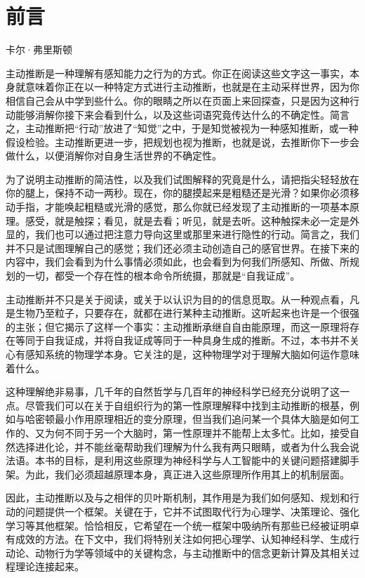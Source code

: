 \chapter*{前言}
卡尔·弗里斯顿

主动推断是一种理解有感知能力之行为的方式。你正在阅读这些文字这一事实，本身就意味着你正在以一种特定方式进行主动推断，也就是在主动采样世界，因为你相信自己会从中学到些什么。你的眼睛之所以在页面上来回探查，只是因为这种行动能够消解你接下来会看到什么，以及这些词语究竟传达什么的不确定性。简言之，主动推断把“行动”放进了“知觉”之中，于是知觉被视为一种感知推断，或一种假设检验。主动推断更进一步，把规划也视为推断，也就是说，去推断你下一步会做什么，以便消解你对自身生活世界的不确定性。

为了说明主动推断的简洁性，以及我们试图解释的究竟是什么，请把指尖轻轻放在你的腿上，保持不动一两秒。现在，你的腿摸起来是粗糙还是光滑？如果你必须移动手指，才能唤起粗糙或光滑的感觉，那么你就已经发现了主动推断的一项基本原理。感受，就是触探；看见，就是去看；听见，就是去听。这种触探未必一定是外显的，我们也可以通过把注意力导向这里或那里来进行隐性的行动。简言之，我们并不只是试图理解自己的感觉；我们还必须主动创造自己的感官世界。在接下来的内容中，我们会看到为什么事情必须如此，也会看到为何我们所感知、所做、所规划的一切，都受一个存在性的根本命令所统摄，那就是“自我证成”。

主动推断并不只是关于阅读，或关于以认识为目的的信息觅取。从一种观点看，凡是生物乃至粒子，只要存在，就都在进行某种主动推断。这听起来也许是一个很强的主张；但它揭示了这样一个事实：主动推断承继自自由能原理，而这一原理将存在等同于自我证成，并将自我证成等同于一种具身生成的推断。不过，本书并不关心有感知系统的物理学本身。它关注的是，这种物理学对于理解大脑如何运作意味着什么。

这种理解绝非易事，几千年的自然哲学与几百年的神经科学已经充分说明了这一点。尽管我们可以在关于自组织行为的第一性原理解释中找到主动推断的根基，例如与哈密顿最小作用原理相近的变分原理，但当我们追问某一个具体大脑是如何工作的、又为何不同于另一个大脑时，第一性原理并不能帮上太多忙。比如，接受自然选择进化论，并不能丝毫帮助我们理解为什么我有两只眼睛，或者为什么我会说法语。本书的目标，是利用这些原理为神经科学与人工智能中的关键问题搭建脚手架。为此，我们必须超越原理本身，真正进入这些原理所作用其上的机制层面。

因此，主动推断以及与之相伴的贝叶斯机制，其作用是为我们如何感知、规划和行动的问题提供一个框架。关键在于，它并不试图取代行为心理学、决策理论、强化学习等其他框架。恰恰相反，它希望在一个统一框架中吸纳所有那些已经被证明卓有成效的方法。在下文中，我们将特别关注如何把心理学、认知神经科学、生成行动论、动物行为学等领域中的关键构念，与主动推断中的信念更新计算及其相关过程理论连接起来。

